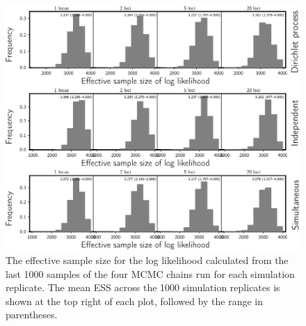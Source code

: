 \begin{figure}[htbp]
    \begin{center}
        \includegraphics[width=\textwidth,height=0.9\textheight,keepaspectratio]{../images/from-project-repo/plots/tex-plot-grids/grid-ess-lnl-histograms-cropped.pdf}
        \caption{
            The effective sample size \citep[ESS;][]{Gong2014} for the
            log likelihood calculated from the last 1000 samples of
            the four MCMC chains run for each simulation replicate.
            The mean ESS across the 1000 simulation replicates is shown at the
            top right of each plot, followed by the range in parentheses.
        }
        \label{fig:esslnl}
    \end{center}
\end{figure}
